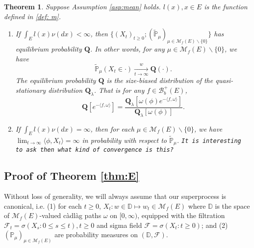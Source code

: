 \documentclass[12pt,a4paper]{amsart}
\numberwithin{equation}{section}
\theoremstyle{plain}
\newtheorem{thm}{Theorem}[section]
\theoremstyle{definition}
\theoremstyle{remark}
\begin{document}
{\begin{thm}\label{thm: structure of Qprocess}
	Suppose Assumption \ref{asp:mean} holds. $l(x), x\in E$ is the function defined in \eqref{def: m}.
\begin{enumerate}
\item
	If $\int_E l(x)\nu(dx)<\infty$, then $\{(X_t)_{t\geq 0};(\widetilde{\mathbb P}_\mu)_{\mu\in\mathcal M_f(E)\backslash\{0\}}\}$ has equilibrium probability ${\mathbf Q}$. In other words, for any $\mu\in\mathcal M_f(E)\backslash\{0\}$, we have
\[
	\widetilde{\mathbb P}_\mu(X_t \in \cdot ) \xrightarrow[t\to \infty]{w} {\mathbf Q}(\cdot).
\]
The equilibrium probability $\mathbf Q$ is the size-biased distribution of the quasi-stationary distribution $\mathbf Q_\lambda$. That is for any $f\in\mathcal B_b^+(E)$,
\[
  	\mathbf Q\left[e^{-\langle f,\omega\rangle}\right] = \dfrac{\mathbf Q_\lambda\left[\omega(\phi)e^{-\langle f,\omega\rangle}\right]}{\mathbf Q_\lambda[\omega(\phi)]}.
\]
\item
	If $\int_El(x)\nu(dx)=\infty$, then for each $\mu \in \mathcal M_f(E)\backslash\{0\}$, we have $\lim_{t\rightarrow\infty}\langle \phi, X_t\rangle =\infty$ in probability with respect to $\widetilde{\mathbb P}_\mu$. {\tt It is interesting to ask then what kind of convergence is this?}
\end{enumerate}
\end{thm}
}
\subsection{Proof of Theorem \ref{thm:E}}

Without loss of generality, we will always assume that our superprocess is canonical, i.e. 
(1) for each $t\geq 0$, $X_t : w\in \mathbb D \mapsto w_t \in \mathcal M_f(E)$ where $\mathbb D$ is the space of $\mathcal M_f(E)$-valued c\`adl\`ag paths $\omega$ on $[0,\infty)$, equipped with the filtration $\mathscr F_t = \sigma(X_s: 0\leq s\leq t), t\geq 0$ and sigma field $\mathscr F= \sigma(X_t:t\geq 0)$; 
and (2) $(\mathbb P_\mu)_{\mu \in \mathcal M_f(E)}$ are probability measures on $(\mathbb D, \mathscr F)$.
\end{document}

